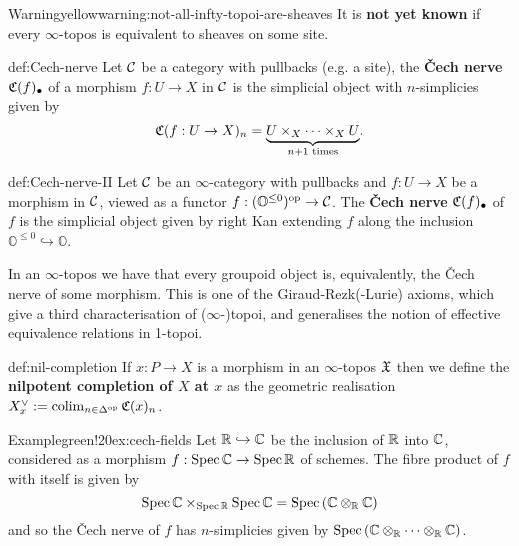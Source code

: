 \begin{env}{Warning}{yellow}{warning:not-all-infty-topoi-are-sheaves}
    It is \textbf{not yet known} if every $\infty$-topos is equivalent to sheaves on some site. 
\end{env}

\begin{definition}{def:Cech-nerve}
    Let $\mathcal{C}$ be a category with pullbacks (e.g. a site), the \textbf{\v{C}ech nerve} $\mathfrak{C}(f)_\bullet$ of a morphism $f : U \to X$ in $\mathcal{C}$ is the simplicial object with $n$-simplicies given by
        \[
        \mathfrak{C}(f : U \to X)_n
        = \underset{n+1 \text{ times}}{\underbrace{U \times_X \dots \times_X U}}.
        \] 
\end{definition}

\begin{definition}{def:Cech-nerve-II}
    Let $\mathcal{C}$ be an $\infty$-category with pullbacks and $f : U \to X$ be a morphism in $\mathcal{C}$, viewed as a functor $f : (\mathbb{O}^{\leq0})^{\text{op}} \to \mathcal{C}$. The \textbf{\v{C}ech nerve} $\mathfrak{C}(f)_\bullet$ of $f$ is the simplicial object given by right Kan extending $f$ along the inclusion $\mathbb{O}^{\leq0} \hookrightarrow \mathbb{O}$. 
\end{definition}

In an $\infty$-topos we have that every groupoid object is, equivalently, the \v{C}ech nerve of some morphism. This is one of the Giraud-Rezk{\color{gray!80}(-Lurie)} axioms, which give a third characterisation of {\color{gray!80}($\infty$-)}topoi, and generalises the notion of effective equivalence relations in 1-topoi. 

\begin{definition}{def:nil-completion}
    If $x : P \to X$ is a morphism in an $\infty$-topos $\mathfrak{X}$ then we define the \textbf{nilpotent completion of $X$ at $x$} as the geometric realisation $X^\vee_x := \operatorname{colim}_{n \in \Delta^{\text{op}}} \mathfrak{C}(x)_n$. 
\end{definition}

\begin{env}[Fields]{Example}{green!20}{ex:cech-fields}
    Let $\mathbb{R} \hookrightarrow \mathbb{C}$ be the inclusion of $\mathbb{R}$ into $\mathbb{C}$, considered as a morphism $f : \operatorname{Spec}\mathbb{C} \to \operatorname{Spec}\mathbb{R}$ of schemes. The fibre product of $f$ with itself is given by
        \[
        \operatorname{Spec}\mathbb{C} \times_{\operatorname{Spec}\mathbb{R}} \operatorname{Spec}\mathbb{C}
        = \operatorname{Spec}\left( \mathbb{C} \otimes_{\mathbb{R}} \mathbb{C} \right)
        \]
    and so the \v{C}ech nerve of $f$ has $n$-simplicies given by $\operatorname{Spec}\left(\mathbb{C} \otimes_{\mathbb{R}} \dots \otimes_{\mathbb{R}} \mathbb{C}\right)$.

\end{env}

